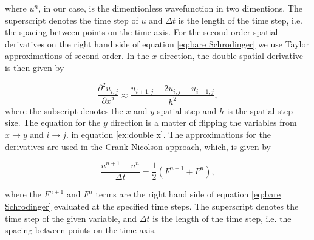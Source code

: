\documentclass[english,notitlepage,reprint,nofootinbib]{revtex4-2}  %
\begin{document}
	\noindent
	where $u^n$, in our case, is the dimentionless wavefunction in two dimentions.
	The superscript denotes the time step of $u$ and $\Delta t$ is the length of the time
	step, i.e. the spacing between points on the time axis.	For the second order spatial derivatives
	on the right hand side of equation \ref{eq:bare Schrodinger}
	we use Taylor approximations of second order. In the $x$ direction,
	the double spatial derivative is then given by
	
	\begin{equation}\label{ex:double x}
		\frac{\partial^2 u_{i,j}}{\partial x^2} \approx \frac{u_{i+1,j}-2u_{i,j}+u_{i-1,j}}{h^2},
	\end{equation}
	where the subscript denotes the $x$ and $y$ spatial step and $h$ is the spatial step size.
	The equation for the $y$ direction is a matter of flipping the variables from
	$x \rightarrow y$ and $i \rightarrow j$.
	in equation \ref{ex:double x}. The approximations for the derivatives are used in
	the Crank-Nicolson approach, which, is given by
	
	\begin{equation}
		\frac{u^{n+1}-u^{n}}{\Delta t} = \frac{1}{2}    \left(     F^{n+1} + F^n     \right),
	\end{equation}

	\noindent
	where the $F^{n+1}$ and $F^n$ terms are the right hand side of equation \ref{eq:bare Schrodinger}
	evaluated at the specified time steps. The superscript denotes the time step of the given variable, and $\Delta t$ is the length of the time step,
	i.e. the spacing between points on the time axis.\\ \\
\end{document}
